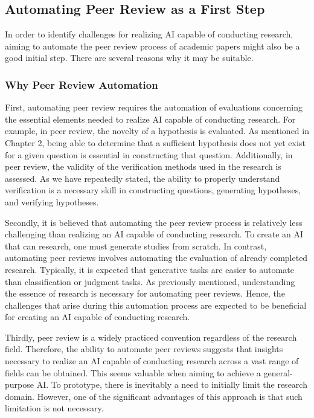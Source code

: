 \subsection{Automating Peer Review as a First Step}
In order to identify challenges for realizing AI capable of conducting research, aiming to automate the peer review process of academic papers might also be a good initial step. There are several reasons why it may be suitable.

\subsubsection{Why Peer Review Automation }

First, automating peer review requires the automation of evaluations concerning the essential elements needed to realize AI capable of conducting research. For example, in peer review, the novelty of a hypothesis is evaluated. As mentioned in Chapter 2, being able to determine that a sufficient hypothesis does not yet exist for a given question is essential in constructing that question. Additionally, in peer review, the validity of the verification methods used in the research is assessed. As we have repeatedly stated, the ability to properly understand verification is a necessary skill in constructing questions, generating hypotheses, and verifying hypotheses.

Secondly, it is believed that automating the peer review process is relatively less challenging than realizing an AI capable of conducting research. To create an AI that can research, one must generate studies from scratch. In contrast, automating peer reviews involves automating the evaluation of already completed research. Typically, it is expected that generative tasks are easier to automate than classification or judgment tasks. As previously mentioned, understanding the essence of research is necessary for automating peer reviews. Hence, the challenges that arise during this automation process are expected to be beneficial for creating an AI capable of conducting research.

Thirdly, peer review is a widely practiced convention regardless of the research field. Therefore, the ability to automate peer reviews suggests that insights necessary to realize an AI capable of conducting research across a vast range of fields can be obtained. This seems valuable when aiming to achieve a general-purpose AI. To prototype, there is inevitably a need to initially limit the research domain. However, one of the significant advantages of this approach is that such limitation is not necessary.

